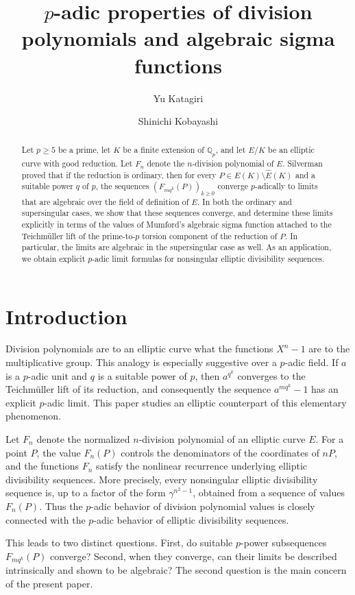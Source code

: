 \documentclass[11pt]{amsart}
\title[]{$p$-adic properties of division polynomials and algebraic sigma functions}
\date{}
\author{Yu Katagiri \and Shinichi Kobayashi}
\theoremstyle{definition}
\begin{document}
\begin{abstract}
Let $p \geq 5$ be a prime, let $K$ be a finite extension of $\mathbb{Q}_p$,
and let $E/K$ be an elliptic curve with good reduction.
Let $F_n$ denote the $n$-division polynomial of $E$.
Silverman proved that if the reduction is ordinary, then for every
$P \in E(K) \setminus \hat{E}(K)$ and a suitable power $q$ of $p$, the
sequences $(F_{mq^k}(P))_{k \geq 0}$  converge
$p$-adically to limits that are algebraic over the field of definition of $E$.
In both the ordinary and supersingular cases, we show that these sequences
converge, and determine these limits
explicitly in terms of the values of Mumford's algebraic sigma function
attached to the Teichm\"uller lift of the prime-to-$p$ torsion component of the reduction
of $P$.
In particular, the limits are algebraic in the supersingular case as well.
As an application, we obtain explicit $p$-adic limit formulas for
nonsingular elliptic divisibility sequences.
\end{abstract}
\maketitle

\section{Introduction}

Division polynomials are to an elliptic curve what the functions $X^n-1$ are
to the multiplicative group. This analogy is especially suggestive over a
$p$-adic field. If $a$ is a $p$-adic unit and $q$ is a suitable power of $p$,
then $a^{q^k}$ converges to the Teichm\"uller lift of its reduction, and
consequently the sequence $a^{mq^k}-1$ has an explicit $p$-adic limit. This
paper studies an elliptic counterpart of this elementary phenomenon.

Let $F_n$ denote the normalized $n$-division polynomial of an elliptic curve $E$. For a point $P$, the value $F_n(P)$ controls the denominators of the coordinates of $nP$, and the functions $F_n$ satisfy the nonlinear recurrence underlying elliptic divisibility sequences. More precisely, every nonsingular elliptic divisibility sequence is, up to a factor of the form $\gamma^{n^2-1}$, obtained from a sequence of values $F_n(P)$. Thus the $p$-adic behavior of division polynomial values is closely connected with the $p$-adic behavior of elliptic divisibility sequences.

This leads to two distinct questions. First, do suitable $p$-power subsequences $F_{mq^k}(P)$ converge? Second, when they converge, can their limits be described intrinsically and shown to be algebraic? The second question is the main concern of the present paper.
\end{document}
